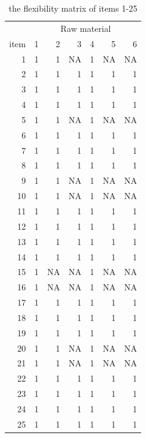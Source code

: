 \documentclass[preprint, 3p,
authoryear]{elsarticle} %
\begin{document}
\begin{table}[!h]

\caption{\label{tab:unnamed-chunk-4}the flexibility matrix of items 1-25}
\centering
\begin{tabular}[t]{r|r|r|r|r|r|r}
\hline
\multicolumn{1}{c|}{ } & \multicolumn{6}{c}{Raw material} \\
\cline{2-7}
item & 1 & 2 & 3 & 4 & 5 & 6\\
\hline
1 & 1 & 1 & NA & 1 & NA & NA\\
\hline
2 & 1 & 1 & 1 & 1 & 1 & 1\\
\hline
3 & 1 & 1 & 1 & 1 & 1 & 1\\
\hline
4 & 1 & 1 & 1 & 1 & 1 & 1\\
\hline
5 & 1 & 1 & NA & 1 & NA & NA\\
\hline
6 & 1 & 1 & 1 & 1 & 1 & 1\\
\hline
7 & 1 & 1 & 1 & 1 & 1 & 1\\
\hline
8 & 1 & 1 & 1 & 1 & 1 & 1\\
\hline
9 & 1 & 1 & NA & 1 & NA & NA\\
\hline
10 & 1 & 1 & NA & 1 & NA & NA\\
\hline
11 & 1 & 1 & 1 & 1 & 1 & 1\\
\hline
12 & 1 & 1 & 1 & 1 & 1 & 1\\
\hline
13 & 1 & 1 & 1 & 1 & 1 & 1\\
\hline
14 & 1 & 1 & 1 & 1 & 1 & 1\\
\hline
15 & 1 & NA & NA & 1 & NA & NA\\
\hline
16 & 1 & NA & NA & 1 & NA & NA\\
\hline
17 & 1 & 1 & 1 & 1 & 1 & 1\\
\hline
18 & 1 & 1 & 1 & 1 & 1 & 1\\
\hline
19 & 1 & 1 & 1 & 1 & 1 & 1\\
\hline
20 & 1 & 1 & NA & 1 & NA & NA\\
\hline
21 & 1 & 1 & NA & 1 & NA & NA\\
\hline
22 & 1 & 1 & 1 & 1 & 1 & 1\\
\hline
23 & 1 & 1 & 1 & 1 & 1 & 1\\
\hline
24 & 1 & 1 & 1 & 1 & 1 & 1\\
\hline
25 & 1 & 1 & 1 & 1 & 1 & 1\\
\hline
\end{tabular}
\end{table}
\pagebreak
\end{document}
